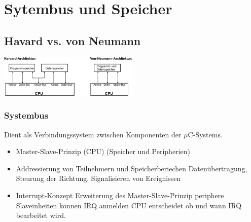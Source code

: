 \section{Sytembus und Speicher}
\subsection{Havard vs. von Neumann}
\includegraphics[width=0.5\textwidth]{images/SystembusSpeicherSpeichersystem/havardneumann}

\subsubsection{Systembus}
Dient als Verbindungssystem zwischen Komponenten der $ \mu $C-Systems.
\begin{itemize}
    \item Master-Slave-Prinzip
    \subitem (CPU) \qquad (Speicher und Peripherien)
    \item Addressierung von Teilnehmern und Speicherberiechen
    \subitem Datenübertragung, Steurung der Richtung, Signalisieren von Ereignissen
    \item Interrupt-Konzept 
    \subitem Erweiterung des Master-Slave-Prinzip periphere Slaveinheiten können IRQ anmelden
    \subitem CPU entscheidet ob und wann IRQ bearbeitet wird. 
\end{itemize}

